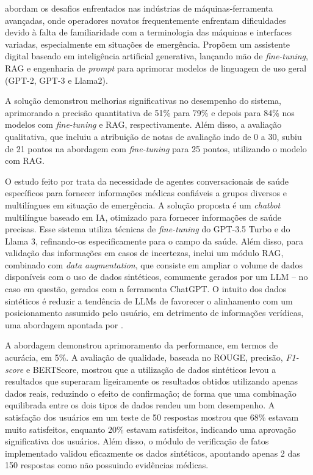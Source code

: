  abordam os desafios enfrentados nas indústrias de máquinas-ferramenta avançadas, onde operadores novatos frequentemente enfrentam dificuldades devido à falta de familiaridade com a terminologia das máquinas e interfaces variadas, especialmente em situações de emergência. Propõem um assistente digital baseado em inteligência artificial generativa, lançando mão de \textit{fine-tuning}, RAG e engenharia de \textit{prompt} para aprimorar modelos de linguagem de uso geral (GPT-2, GPT-3 e Llama2).

A solução demonstrou melhorias significativas no desempenho do sistema, aprimorando a precisão quantitativa de 51\% para 79\% e depois para 84\% nos modelos com \textit{fine-tuning} e RAG, respectivamente. Além disso, a avaliação qualitativa, que incluiu a atribuição de notas de avaliação indo de 0 a 30, subiu de 21 pontos na abordagem com \textit{fine-tuning} para 25 pontos, utilizando o modelo com \ac{RAG}.

O estudo feito por  trata da necessidade de agentes conversacionais de saúde específicos para fornecer informações médicas confiáveis a grupos diversos e multilíngues em situação de emergência. A solução proposta é um \textit{chatbot} multilíngue baseado em IA, otimizado para fornecer informações de saúde precisas. Esse sistema utiliza técnicas de \textit{fine-tuning} do GPT-3.5 Turbo e do Llama 3, refinando-os especificamente para o campo da saúde. Além disso, para validação das informações em casos de incertezas, inclui um módulo \ac{RAG}, combinado com \textit{data augmentation}, que consiste em ampliar o volume de dados disponíveis com o uso de dados sintéticos, comumente gerados por um \ac{LLM} -- no caso em questão, gerados com a ferramenta ChatGPT. O intuito dos dados sintéticos é reduzir a tendência de \ac{LLM}s de favorecer o alinhamento com um posicionamento assumido pelo usuário, em detrimento de informações verídicas, uma abordagem apontada por .

A abordagem demonstrou aprimoramento da performance, em termos de acurácia, em 5\%. A avaliação de qualidade, baseada no ROUGE, precisão, \textit{F1-score} e BERTScore, mostrou que a utilização de dados sintéticos levou a resultados que superaram ligeiramente os resultados obtidos utilizando apenas dados reais, reduzindo o efeito de confirmação; de forma que uma combinação equilibrada entre os dois tipos de dados rendeu um bom desempenho. A satisfação dos usuários em um teste de 50 respostas mostrou que 68\% estavam muito satisfeitos, enquanto 20\% estavam satisfeitos, indicando uma aprovação significativa dos usuários. Além disso, o módulo de verificação de fatos implementado validou eficazmente os dados sintéticos, apontando apenas 2 das 150 respostas como não possuindo evidências médicas.

